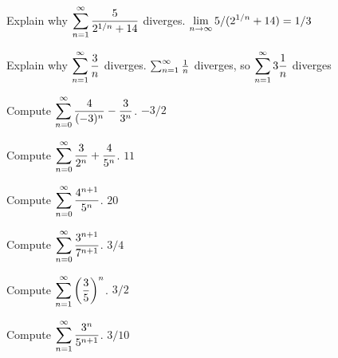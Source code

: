 \exercise Explain why $\displaystyle\sum_{n=1}^\infty {5\over 2^{1/n}+14}$
diverges.
\answer $\displaystyle\lim_{n\to\infty} 5/(2^{1/n}+14)=1/3$
\endanswer
\endexercise

\exercise Explain why $\displaystyle\sum_{n=1}^\infty {3\over n}$
diverges.
\answer $\sum_{n=1}^\infty {1\over n}$ diverges, so $\displaystyle\sum_{n=1}^\infty 3{1\over n}$ diverges
\endanswer

\twocol
\endexercise

\exercise Compute $\displaystyle\sum_{n=0}^\infty {4\over (-3)^n}- {3\over 3^n}$. 
\answer $-3/2$
\endanswer
\endexercise

\exercise Compute $\displaystyle\sum_{n=0}^\infty {3\over 2^n}+ {4\over 5^n}$. 
\answer $11$
\endanswer
\endexercise

\exercise Compute $\displaystyle\sum_{n=0}^\infty {4^{n+1}\over 5^n}$.
\answer $20$
\endanswer
\endexercise

\exercise Compute $\displaystyle\sum_{n=0}^\infty {3^{n+1}\over 7^{n+1}}$.
\answer $3/4$
\endanswer
\endexercise

\exercise Compute $\displaystyle\sum_{n=1}^\infty \left({3\over 5}\right)^n$.
\answer $3/2$
\endanswer
\endexercise

\exercise Compute $\displaystyle\sum_{n=1}^\infty {3^n\over 5^{n+1}}$.
\answer $3/10$
\endanswer

\endtwocol
\endexercise

\endexercises


